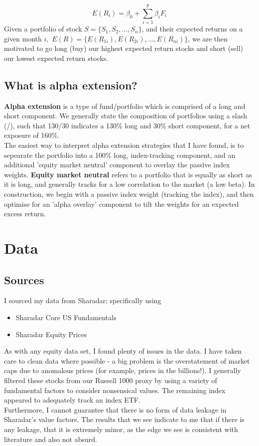 \documentclass[12pt]{article}
\begin{document}
$$ E(R_i) = \beta_0 + \sum_{i=1}^p \beta_i F_i$$
Given a portfolio of stock $S = \{S_1, S_2, \dots, S_n\}$, and their expected returns on a given month $i,$ $E(R) = \{E(R_{1i}), E(R_{2i}), \dots, E(R_{ni})\}$, we are then motivated to go long (buy) our highest
expected return stocks and short (sell) our lowest expected return stocks.
\subsection{What is alpha extension?}
\textbf{Alpha extension} is a type of fund/portfolio which is comprised of a long and short component. We 
generally state the composition of portfolios using a slash (/), such that 130/30 indicates a 130\% long 
and 30\% short component, for a net exposure of 160\%.
\newline \\ 
The easiest way to interpret alpha extension strategies that I have found, is to sepearate the portfolio
into a 100\% long, index-tracking component, and an additional 'equity market neutral' component to overlay
the passive index weights. \textbf{Equity market neutral} refers to a portfolio that is equally as short 
as it is long, and generally tracks for a low correlation to the market (a low beta).
In construction, we begin with a passive index weight (tracking the index), and then optimise for an 'alpha 
overlay' component to tilt the weights for an expected excess return.

\section{Data}
\subsection{Sources}

I sourced my data from Sharadar; specifically using 
\begin{itemize}
    \item Sharadar Core US Fundamentals
    \item Sharadar Equity Prices
\end{itemize}
As with any equity data set, I found plenty of issues in the data. I have taken care to clean data where possible - a big problem is the overstatement of market caps due to anomalous prices (for example, prices 
in the billions!). I generally filtered these stocks from our Russell 1000 proxy by using a variety 
of fundamental factors to consider nonsensical values. The remaining index appeared to adequately
track an index ETF.
\newline \\ 
Furthermore, I cannot guarantee that there is no form of data leakage in Sharadar's value factors. The results
that we see indicate to me that if there is any leakage, that it is extremely minor, as the edge we see 
is consistent with literature and also not absurd.
\end{document}
